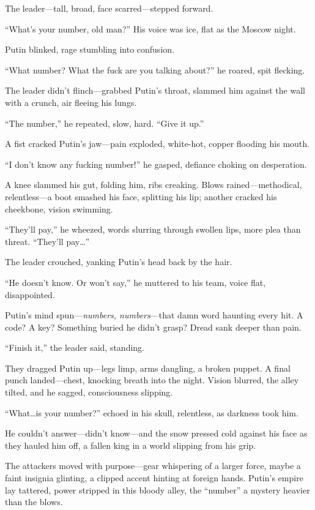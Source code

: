 \documentclass[12pt]{book}
\begin{document}
The leader---tall, broad, face scarred---stepped forward.

\enquote{What’s your number, old man?} His voice was ice, flat as the Moscow night.

Putin blinked, rage stumbling into confusion.

\enquote{What number? What the fuck are you talking about?} he roared, spit flecking.

The leader didn’t flinch---grabbed Putin’s throat, slammed him against the wall with a crunch, air fleeing his lungs.

\enquote{The number,} he repeated, slow, hard. \enquote{Give it up.}

A fist cracked Putin’s jaw---pain exploded, white-hot, copper flooding his mouth.

\enquote{I don’t know any fucking number!} he gasped, defiance choking on desperation.

A knee slammed his gut, folding him, ribs creaking. Blows rained---methodical, relentless---a boot smashed his face, splitting his lip; another cracked his cheekbone, vision swimming.

\enquote{They’ll pay,} he wheezed, words slurring through swollen lips, more plea than threat. \enquote{They’ll pay\ldots}

The leader crouched, yanking Putin’s head back by the hair.

\enquote{He doesn’t know. Or won’t say,} he muttered to his team, voice flat, disappointed.

Putin’s mind spun---\textit{numbers, numbers}---that damn word haunting every hit. A code? A key? Something buried he didn’t grasp? Dread sank deeper than pain.

\enquote{Finish it,} the leader said, standing.

They dragged Putin up---legs limp, arms dangling, a broken puppet. A final punch landed---chest, knocking breath into the night. Vision blurred, the alley tilted, and he sagged, consciousness slipping.

\enquote{What\ldots is your number?} echoed in his skull, relentless, as darkness took him.

He couldn’t answer---didn’t know---and the snow pressed cold against his face as they hauled him off, a fallen king in a world slipping from his grip.

The attackers moved with purpose---gear whispering of a larger force, maybe a faint insignia glinting, a clipped accent hinting at foreign hands. Putin’s empire lay tattered, power stripped in this bloody alley, the \enquote{number} a mystery heavier than the blows.
\end{document}
